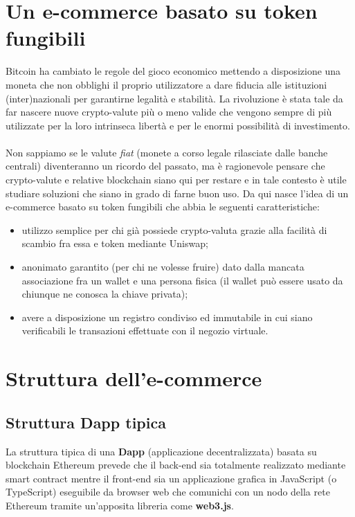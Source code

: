\section{Un e-commerce basato su token fungibili}
Bitcoin ha cambiato le regole del gioco economico mettendo a disposizione una moneta che non obblighi il proprio utilizzatore a dare fiducia alle istituzioni (inter)nazionali per garantirne legalità e stabilità. La rivoluzione è stata tale da far nascere nuove crypto-valute più o meno valide che vengono sempre di più utilizzate per la loro intrinseca libertà e per le enormi possibilità di investimento.
\\\\
Non sappiamo se le valute \textit{fiat} (monete a corso legale rilasciate dalle banche centrali) diventeranno un ricordo del passato, ma è ragionevole pensare che crypto-valute e relative blockchain siano qui per restare e in tale contesto è utile studiare soluzioni che siano in grado di farne buon uso. Da qui nasce l'idea di un e-commerce basato su token fungibili che abbia le seguenti caratteristiche:
\begin{itemize}
    \item utilizzo semplice per chi già possiede crypto-valuta grazie alla facilità di scambio fra essa e token mediante Uniswap;
    \item anonimato garantito (per chi ne volesse fruire) dato dalla mancata associazione fra un wallet e una persona fisica (il wallet può essere usato da chiunque ne conosca la chiave privata);
    \item avere a disposizione un registro condiviso ed immutabile in cui siano verificabili le transazioni effettuate con il negozio virtuale.
\end{itemize}

\newpage

\section{Struttura dell'e-commerce}
    \subsection{Struttura Dapp tipica}
    La struttura tipica di una \textbf{Dapp} (applicazione decentralizzata) basata su blockchain Ethereum prevede che il back-end sia totalmente realizzato mediante smart contract mentre il front-end sia un applicazione grafica in JavaScript (o TypeScript) eseguibile da browser web che comunichi con un nodo della rete Ethereum tramite un'apposita libreria come \textbf{web3.js}.

